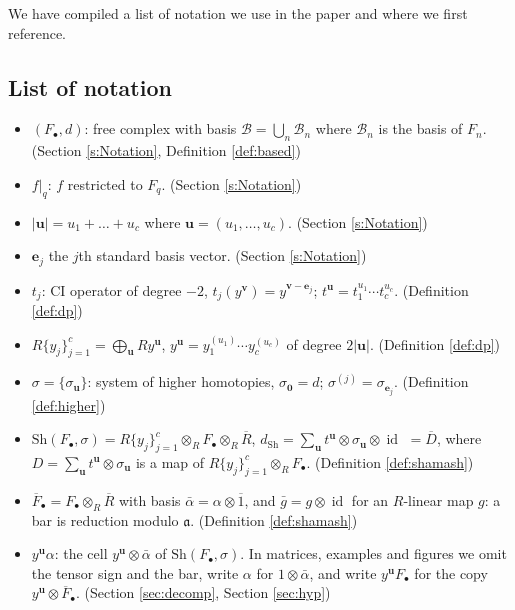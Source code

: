 \documentclass[12pt]{amsart}
\theoremstyle{plain}
\theoremstyle{definition}
\newcommand{\F}{ {F_\bullet} }
\newcommand{\Rbar}{\overline{R}}
\newcommand{\B}{\mathcal{B}}
\newcommand{\id}{\operatorname{id}}
\newcommand{\aaa}{\mathfrak{a}}
\newcommand{\Sh}{\mathrm{Sh}}
\newcommand{\cbl}{\color{blue}}
\begin{document}
We have compiled a list of notation we use in the paper and where we first reference.

\subsection*{List of notation}
\begin{itemize}[leftmargin=*,itemsep=0pt,parsep=0pt]
    \item $(\F, d)$: free complex with basis
     $\B=\bigcup_n \B_n$ where $\B_n$ is the basis of $F_n$. {\cbl (Section \ref{s:Notation}, Definition \ref{def:based})}
    \item $f|_q$: $f$ restricted to $F_q$. {\cbl (Section \ref{s:Notation})}
    \item $|\boldsymbol{u}| = u_1 + \dots + u_c$ where $\boldsymbol{u}=(u_1, \ldots, u_c)$. {\cbl (Section \ref{s:Notation})}
    \item $\boldsymbol{e}_j$ the $j$th standard basis vector. {\cbl (Section \ref{s:Notation})}
    \item $t_j$: CI operator of degree $-2$, $t_j(y^{\boldsymbol{v}}) = y^{\boldsymbol{v} - \boldsymbol{e}_j}$; $t^{\boldsymbol{u}} = t_1^{u_1} \cdots t_c^{u_c}$. {\cbl (Definition \ref{def:dp})}
    \item $R\{y_j\}_{j=1}^{c} = \bigoplus_{\boldsymbol{u}} R y^{\boldsymbol{u}}$, $y^{\boldsymbol{u}} = y_1^{(u_1)} \cdots y_c^{(u_c)}$ of degree $2|\boldsymbol{u}|$. {\cbl (Definition \ref{def:dp})}
    \item $\sigma = \{\sigma_{\boldsymbol{u}}\}$: system of higher homotopies, $\sigma_{\boldsymbol{0}} = d$; $\sigma^{(j)} = \sigma_{\boldsymbol{e}_j}$. {\cbl (Definition \ref{def:higher})}
    \item $\Sh(\F, \sigma) = R\{y_j\}_{j=1}^{c} \otimes_R \F \otimes_R \Rbar$, $d_{\Sh} = \sum_{\boldsymbol{u}} t^{\boldsymbol{u}} \otimes \sigma_{\boldsymbol{u}} \otimes \id$ $= \overline{D}$, where $D = \sum_{\boldsymbol{u}} t^{\boldsymbol{u}} \otimes \sigma_{\boldsymbol{u}}$ is a map of $R\{y_j\}_{j=1}^{c} \otimes_R \F$. {\cbl (Definition \ref{def:shamash})}
    \item $\overline{F}_\bullet = \F \otimes_R \Rbar$ with basis $\bar\alpha = \alpha \otimes \overline{1}$, and $\bar g = g \otimes \id$ for an $R$-linear map $g$: a bar is reduction modulo $\aaa$. {\cbl (Definition \ref{def:shamash})}
    \item $y^{\boldsymbol{u}} \alpha$: the cell $y^{\boldsymbol{u}} \otimes \bar\alpha$ of $\Sh(\F, \sigma)$. In matrices, examples and figures we omit the tensor sign and the bar, write $\alpha$ for $1 \otimes \bar\alpha$, and write $y^{\boldsymbol{u}} F_\bullet$ for the copy $y^{\boldsymbol{u}} \otimes \overline{F}_\bullet$. {\cbl (Section \ref{sec:decomp}, Section \ref{sec:hyp})}

\end{itemize}
\end{document}
